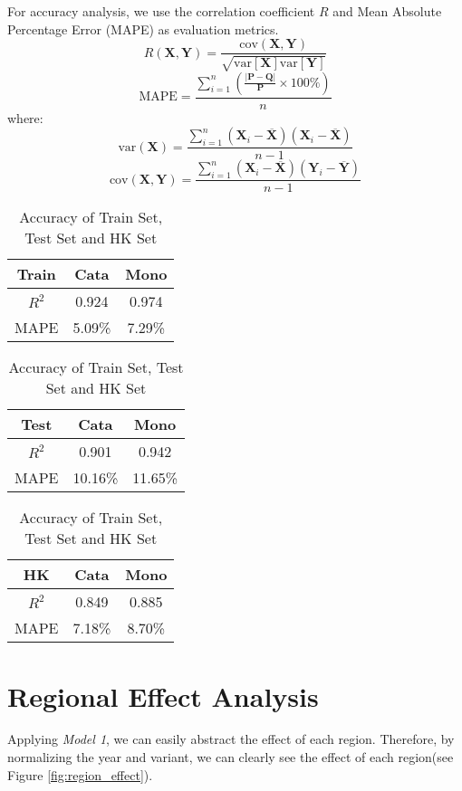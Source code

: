 \documentclass[12pt]{article}  %
\begin{document}
For accuracy analysis, we use the correlation coefficient $R$ and Mean Absolute Percentage Error (MAPE) as evaluation metrics.
$$R(\textbf{X},\textbf{Y})=\frac{\text{cov}(\textbf{X},\textbf{Y})}{\sqrt{\text{var}[\textbf{X}] \text{var}[\textbf{Y}]}}$$
$$\text{MAPE} = \frac{\sum_{i = 1}^n (\frac{|\textbf{P} - \textbf{Q}|}{\textbf{P}} \times 100\%)}{n}$$
where:
    $$\text{var}(\textbf{X})=\frac{\sum_{i=1}^{n}(\textbf{X}_i-\overline{\textbf{X}})(\textbf{X}_i-\overline{\textbf{X}})}{n-1}$$
    $$\text{cov}(\textbf{X},\textbf{Y})=\frac{\sum_{i=1}^{n}(\textbf{X}_i-\overline{\textbf{X}})(\textbf{Y}_i-\overline{\textbf{Y}})}{n-1}$$


    \begin{table}[htbp]
        \centering
        \begin{tabular}{c|c|c}
        Train& Cata& Mono \\
        \hline
        \hline
        $R^2$ & 0.924 & 0.974 \\
        \hline
        MAPE & 5.09\% & 7.29\% \\
        \hline
        \end{tabular}
        \qquad
        \begin{tabular}{c|c|c}
        Test& Cata& Mono \\
        \hline
        \hline
        $R^2$ & 0.901 & 0.942 \\
        \hline
        MAPE & 10.16\% & 11.65\% \\
        \hline
        \end{tabular}
        \qquad
        \begin{tabular}{c|c|c}
        HK& Cata& Mono \\
            \hline
            \hline
            $R^2$ & 0.849 & 0.885 \\
            \hline
            MAPE & 7.18\% & 8.70\% \\
            \hline
            \end{tabular}
        \caption{Accuracy of Train Set, Test Set and HK Set}
        \label{tab:Accuracy}
    \end{table}



\section{Regional Effect Analysis}
Applying \emph{Model 1}, we can easily abstract the effect of each region. 
Therefore, by normalizing the year and variant, 
we can clearly see the effect of each region(see Figure \ref{fig:region_effect}).
\end{document}
